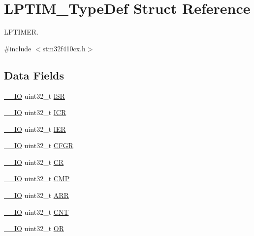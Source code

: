 \hypertarget{struct_l_p_t_i_m___type_def}{}\section{L\+P\+T\+I\+M\+\_\+\+Type\+Def Struct Reference}
\label{struct_l_p_t_i_m___type_def}


L\+P\+T\+I\+M\+ER.  




{\ttfamily \#include $<$stm32f410cx.\+h$>$}

\subsection*{Data Fields}
\begin{DoxyCompactItemize}
\item 
\hyperlink{core__sc300_8h_aec43007d9998a0a0e01faede4133d6be}{\+\_\+\+\_\+\+IO} uint32\+\_\+t \hyperlink{struct_l_p_t_i_m___type_def_ab3c49a96815fcbee63d95e1e74f20e75}{I\+SR}
\item 
\hyperlink{core__sc300_8h_aec43007d9998a0a0e01faede4133d6be}{\+\_\+\+\_\+\+IO} uint32\+\_\+t \hyperlink{struct_l_p_t_i_m___type_def_a0a8c8230846fd8ff154b9fde8dfa0399}{I\+CR}
\item 
\hyperlink{core__sc300_8h_aec43007d9998a0a0e01faede4133d6be}{\+\_\+\+\_\+\+IO} uint32\+\_\+t \hyperlink{struct_l_p_t_i_m___type_def_a6566f8cfbd1d8aa7e8db046aa35e77db}{I\+ER}
\item 
\hyperlink{core__sc300_8h_aec43007d9998a0a0e01faede4133d6be}{\+\_\+\+\_\+\+IO} uint32\+\_\+t \hyperlink{struct_l_p_t_i_m___type_def_a26f1e746ccbf9c9f67e7c60e61085ec1}{C\+F\+GR}
\item 
\hyperlink{core__sc300_8h_aec43007d9998a0a0e01faede4133d6be}{\+\_\+\+\_\+\+IO} uint32\+\_\+t \hyperlink{struct_l_p_t_i_m___type_def_ab40c89c59391aaa9d9a8ec011dd0907a}{CR}
\item 
\hyperlink{core__sc300_8h_aec43007d9998a0a0e01faede4133d6be}{\+\_\+\+\_\+\+IO} uint32\+\_\+t \hyperlink{struct_l_p_t_i_m___type_def_a12521d40371a2f123a6834c74f2b2041}{C\+MP}
\item 
\hyperlink{core__sc300_8h_aec43007d9998a0a0e01faede4133d6be}{\+\_\+\+\_\+\+IO} uint32\+\_\+t \hyperlink{struct_l_p_t_i_m___type_def_af17f19bb4aeea3cc14fa73dfa7772cb8}{A\+RR}
\item 
\hyperlink{core__sc300_8h_aec43007d9998a0a0e01faede4133d6be}{\+\_\+\+\_\+\+IO} uint32\+\_\+t \hyperlink{struct_l_p_t_i_m___type_def_a6095a27d764d06750fc0d642e08f8b2a}{C\+NT}
\item 
\hyperlink{core__sc300_8h_aec43007d9998a0a0e01faede4133d6be}{\+\_\+\+\_\+\+IO} uint32\+\_\+t \hyperlink{struct_l_p_t_i_m___type_def_a75ade4a9b3d40781fd80ce3e6589e98b}{OR}
\end{DoxyCompactItemize}


